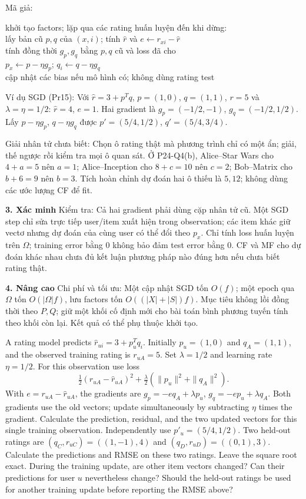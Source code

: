 \documentclass[10pt,a4paper,twocolumn]{article}
\makeatletter
\newcommand{\key}[1]{#1:\enspace}
\newcommand{\unitheading}[2]{%
  \par\addvspace{1pt}\noindent\textbf{#1. #2}\enspace}
\newcommand{\unitverification}{\unitheading{3}{Xác minh}}
\newcommand{\unitadvanced}{\unitheading{4}{Nâng cao}}
\newenvironment{algpseudo}{%
  \par\addvspace{2pt}\noindent
  \setlength{\parskip}{0pt}%
  Mã giả:\par\nobreak
  \begin{list}{}{\setlength{\leftmargin}{1em}\setlength{\topsep}{0pt}%
    \setlength{\partopsep}{0pt}\setlength{\parsep}{0pt}%
    \@beginparpenalty=10000\relax}%
  \item\relax
}{\end{list}\par\addvspace{3pt}}
\makeatother
\begin{document}
\begin{algpseudo}
khởi tạo factors; lặp qua các rating huấn luyện đến khi dừng:\\
\quad lấy bản cũ $p,q$ của $(x,i)$; tính $\hat r$ và $e\gets r_{xi}-\hat r$\\
\quad tính đồng thời $g_p,g_q$ bằng $p,q$ cũ và loss đã cho\\
\quad $p_x\gets p-\eta g_p$; $q_i\gets q-\eta g_q$\\
\quad cập nhật các bias nếu mô hình có; không dùng rating test
\end{algpseudo}

\key{Ví dụ SGD (Pr15)} Với $\hat r=3+p^Tq$, $p=(1,0)$, $q=(1,1)$, $r=5$ và $\lambda=\eta=1/2$: $\hat r=4$, $e=1$. Hai gradient là $g_p=(-1/2,-1)$, $g_q=(-1/2,1/2)$. Lấy $p-\eta g_p$, $q-\eta g_q$ được $p'=(5/4,1/2)$, $q'=(5/4,3/4)$.

\key{Giải nhân tử chưa biết} Chọn ô rating thật mà phương trình chỉ có một ẩn; giải, thế ngược rồi kiểm tra mọi ô quan sát. Ở P24-Q4(b), Alice--Star Wars cho $4+a=5$ nên $a=1$; Alice--Inception cho $8+c=10$ nên $c=2$; Bob--Matrix cho $b+6=9$ nên $b=3$. Tích hoàn chỉnh dự đoán hai ô thiếu là $5,12$; không dùng các ước lượng CF để fit.

\unitverification
\key{Kiểm tra} Cả hai gradient phải dùng cặp nhân tử cũ. Một SGD step chỉ sửa trực tiếp user/item xuất hiện trong observation; các item khác giữ vectơ nhưng dự đoán của cùng user có thể đổi theo $p_x$. Chỉ tính loss huấn luyện trên $\Omega$; training error bằng 0 không bảo đảm test error bằng 0. CF và MF cho dự đoán khác nhau chưa đủ kết luận phương pháp nào đúng hơn nếu chưa biết rating thật.

\unitadvanced
\key{Chi phí và tối ưu} Một cập nhật SGD tốn $O(f)$; một epoch qua $\Omega$ tốn $O(|\Omega|f)$, lưu factors tốn $O((|X|+|S|)f)$. Mục tiêu không lồi đồng thời theo $P,Q$; giữ một khối cố định mới cho bài toán bình phương tuyến tính theo khối còn lại. Kết quả có thể phụ thuộc khởi tạo.


A rating model predicts $\hat r_{ui}=3+p_u^Tq_i$. Initially $p_u=(1,0)$ and $q_A=(1,1)$, and the observed training rating is $r_{uA}=5$. Set $\lambda=1/2$ and learning rate $\eta=1/2$. For this observation use loss
\[
\tfrac12(r_{uA}-\hat r_{uA})^2+\tfrac{\lambda}{2}(\|p_u\|^2+\|q_A\|^2).
\]
With $e=r_{uA}-\hat r_{uA}$, the gradients are $g_p=-eq_A+\lambda p_u$, $g_q=-ep_u+\lambda q_A$. Both gradients use the old vectors; update simultaneously by subtracting $\eta$ times the gradient.
 Calculate the prediction, residual, and the two updated vectors for this single training observation.
 Independently use $p'_u=(5/4,1/2)$. Two held-out ratings are $(q_C,r_{uC})=((1,-1),4)$ and $(q_D,r_{uD})=((0,1),3)$. Calculate the predictions and RMSE on these two ratings. Leave the square root exact.
 During the training update, are other item vectors changed? Can their predictions for user $u$ nevertheless change? Should the held-out ratings be used for another training update before reporting the RMSE above?
\end{document}
